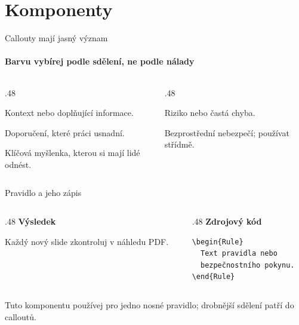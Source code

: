 \section{Komponenty}

\begin{frame}{Callouty mají jasný význam}
  \framesubtitle{Barvu vybírej podle sdělení, ne podle nálady}
  \begin{columns}[T,totalwidth=\textwidth]
    \begin{column}{.48\textwidth}
      \begin{Note}Kontext nebo doplňující informace.\end{Note}
      \begin{Tip}Doporučení, které práci usnadní.\end{Tip}
      \begin{Important}Klíčová myšlenka, kterou si mají lidé odnést.\end{Important}
    \end{column}
    \begin{column}{.48\textwidth}
      \begin{Warning}Riziko nebo častá chyba.\end{Warning}
      \begin{Caution}Bezprostřední nebezpečí; používat střídmě.\end{Caution}
    \end{column}
  \end{columns}
\end{frame}

\begin{frame}[fragile]{Pravidlo a jeho zápis}
  \begin{columns}[T,totalwidth=\textwidth]
    \begin{column}{.48\textwidth}
      \textbf{Výsledek}
      \vspace{2mm}

      \begin{Rule}
        Každý nový slide zkontroluj v náhledu PDF.
      \end{Rule}
    \end{column}
    \begin{column}{.48\textwidth}
      \textbf{Zdrojový kód}
      \vspace{2mm}

      \begin{verbatim}
\begin{Rule}
  Text pravidla nebo
  bezpečnostního pokynu.
\end{Rule}
      \end{verbatim}
    \end{column}
  \end{columns}

  \vspace{4mm}
  \begin{Note}
    Tuto komponentu používej pro jedno nosné pravidlo; drobnější sdělení patří do calloutů.
  \end{Note}
\end{frame}

